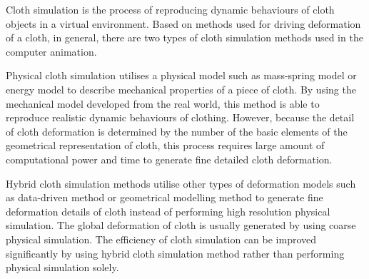 Cloth simulation is the process of reproducing dynamic behaviours of cloth objects in a virtual environment. Based on methods used for driving deformation of a cloth, in general, there are two types of cloth simulation methods used in the computer animation. 

Physical cloth simulation utilises a physical model such as mass-spring model or energy model to describe mechanical properties of a piece of cloth. By using the mechanical model developed from the real world, this method is able to reproduce realistic dynamic behaviours of clothing. However, because the detail of cloth deformation is determined by the number of the basic elements of the geometrical representation of cloth, this process requires large amount of computational power and time to generate fine detailed cloth deformation. 

Hybrid cloth simulation methods utilise other types of deformation models such as data-driven method or geometrical modelling method to generate fine deformation details of cloth instead of performing high resolution physical simulation. The global deformation of cloth is usually generated by using coarse physical simulation. The efficiency of cloth simulation can be improved significantly by using hybrid cloth simulation method rather than performing physical simulation solely.

